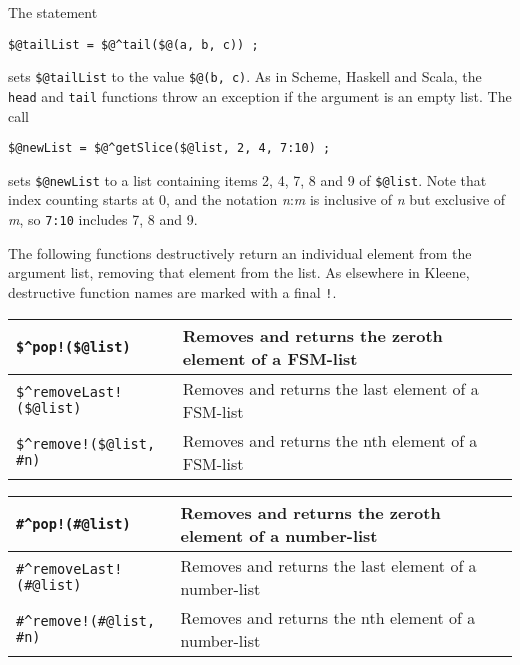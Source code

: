 \vspace{.5cm}

\noindent
The statement

\begin{Verbatim}
$@tailList = $@^tail($@(a, b, c)) ;
\end{Verbatim}

\noindent
sets \verb!$@tailList! to the value \verb!$@(b, c)!.  As in Scheme,
Haskell and Scala, the \texttt{head} and \texttt{tail} functions throw an
exception if the argument is an empty list.  The call

\begin{Verbatim}
$@newList = $@^getSlice($@list, 2, 4, 7:10) ;
\end{Verbatim}

\noindent
sets \verb!$@newList! to a list containing items 2, 4, 7, 8 and 9 of
\verb!$@list!.  Note that index counting starts at 0, and the notation
\emph{n}:\emph{m} is inclusive of \emph{n} but exclusive of \emph{m}, so
\texttt{7:10} includes 7, 8 and 9.

The following functions destructively return an individual element from
the argument list, removing that element from the list.  As elsewhere in
Kleene, destructive function names are marked with a final \verb+!+.

\vspace{.5cm}

\noindent
\begin{tabular}{|l|p{6cm}|}
\hline
\verb+$^pop!($@list)+ & Removes and returns the zeroth element of a FSM-list\\
\hline
\verb+$^removeLast!($@list)+ & Removes and returns the last element of a
FSM-list\\
\hline
\verb+$^remove!($@list, #n)+ & Removes and returns the nth element of a
FSM-list\\
\hline
\end{tabular}

\vspace{.5cm}

\noindent
\begin{tabular}{|l|p{6cm}|}
\hline
\verb+#^pop!(#@list)+ & Removes and returns the zeroth element of a number-list\\
\hline
\verb+#^removeLast!(#@list)+ & Removes and returns the last element of a number-list\\
\hline
\verb+#^remove!(#@list, #n)+ & Removes and returns the nth element of a number-list\\
\hline
\end{tabular}

